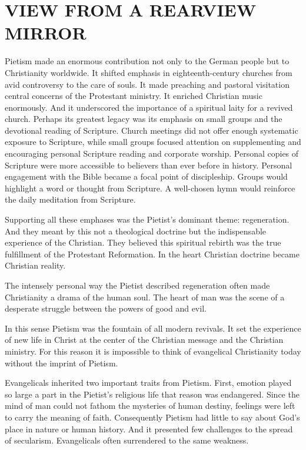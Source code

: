 \section{VIEW FROM A REARVIEW MIRROR}

Pietism made an enormous contribution not only to the German people but to Christianity worldwide.
It shifted emphasis in eighteenth-century churches from avid controversy to the care of souls. It
made preaching and pastoral visitation central concerns of the Protestant ministry. It enriched
Christian music enormously. And it underscored the importance of a spiritual laity for a revived
church. Perhaps its greatest legacy was its emphasis on small groups and the devotional reading of
Scripture. Church meetings did not offer enough systematic exposure to Scripture, while small groups
focused attention on supplementing and encouraging personal Scripture reading and corporate worship.
Personal copies of Scripture were more accessible to believers than ever before in history. Personal
engagement with the Bible became a focal point of discipleship. Groups would highlight a word or
thought from Scripture. A well-chosen hymn would reinforce the daily meditation from Scripture.

Supporting all these emphases was the Pietist’s dominant theme: regeneration. And they meant by this
not a theological doctrine but the indispensable experience of the Christian. They believed this
spiritual rebirth was the true fulfillment of the Protestant Reformation. In the heart Christian
doctrine became Christian reality.

The intensely personal way the Pietist described regeneration often made Christianity a drama of the
human soul. The heart of man was the scene of a desperate struggle between the powers of good and
evil.

In this sense Pietism was the fountain of all modern revivals. It set the experience of new life in
Christ at the center of the Christian message and the Christian ministry. For this reason it is
impossible to think of evangelical Christianity today without the imprint of Pietism.

Evangelicals inherited two important traits from Pietism. First, emotion played so large a part in
the Pietist’s religious life that reason was endangered. Since the mind of man could not fathom the
mysteries of human destiny, feelings were left to carry the meaning of faith. Consequently Pietism
had little to say about God’s place in nature or human history. And it presented few challenges to
the spread of secularism. Evangelicals often surrendered to the same weakness.

